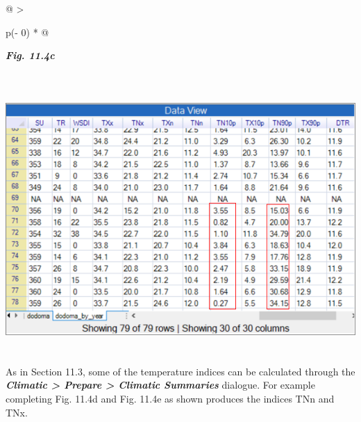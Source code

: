 \documentclass[
  letterpaper,
  DIV=11,
  numbers=noendperiod]{scrreprt}
\begin{document}
\begin{longtable}[]{@{}
  >{\raggedright\arraybackslash}p{(\columnwidth - 0\tabcolsep) * }@{}}
\toprule\noalign{}
\begin{minipage}[b]{\linewidth}\raggedright
\textbf{\emph{Fig. 11.4c}}
\end{minipage} \\
\midrule\noalign{}
\endhead
\bottomrule\noalign{}
\endlastfoot
\includegraphics[width=6.06997in,height=3.98859in]{figures/Fig11.4c.png} \\
\end{longtable}

As in Section 11.3, some of the temperature indices can be calculated
through the \textbf{\emph{Climatic \textgreater{} Prepare \textgreater{}
Climatic Summaries}} dialogue. For example completing Fig. 11.4d and
Fig. 11.4e as shown produces the indices TNn and TNx.
\end{document}
